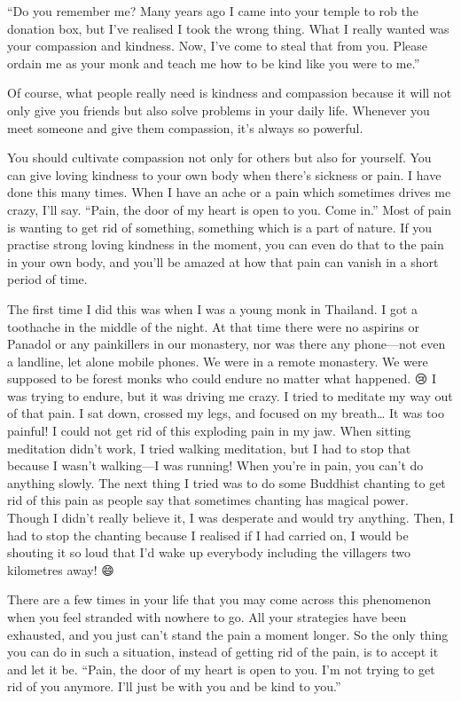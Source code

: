 \documentclass[12pt, openany]{book}
\begin{document}
“Do you remember me? Many years ago I came into your temple to rob the donation box, but I’ve realised I took the wrong thing. What I really wanted was your compassion and kindness. Now, I’ve come to steal that from you. Please ordain me as your monk and teach me how to be kind like you were to me.” 

Of course, what people really need is kindness and compassion because it will not only give you friends but also solve problems in your daily life. Whenever you meet someone and give them compassion, it’s always so powerful. 

You should cultivate compassion not only for others but also for yourself. You can give loving kindness to your own body when there’s sickness or pain. I have done this many times. When I have an ache or a pain which sometimes drives me crazy, I’ll say. “Pain, the door of my heart is open to you. Come in.” Most of pain is wanting to get rid of something, something which is a part of nature. If you practise strong loving kindness in the moment, you can even do that to the pain in your own body, and you’ll be amazed at how that pain can vanish in a short period of time. 

The first time I did this was when I was a young monk in Thailand. I got a toothache in the middle of the night. At that time there were no aspirins or Panadol or any painkillers in our monastery, nor was there any phone—not even a landline, let alone mobile phones. We were in a remote monastery. We were supposed to be forest monks who could endure no matter what happened. 😢 I was trying to endure, but it was driving me crazy. I tried to meditate my way out of that pain. I sat down, crossed my legs, and focused on my breath… It was too painful! I could not get rid of this exploding pain in my jaw. When sitting meditation didn’t work, I tried walking meditation, but I had to stop that because I wasn’t walking—I was running! When you’re in pain, you can’t do anything slowly. The next thing I tried was to do some Buddhist chanting to get rid of this pain as people say that sometimes chanting has magical power. Though I didn’t really believe it, I was desperate and would try anything. Then, I had to stop the chanting because I realised if I had carried on, I would be shouting it so loud that I’d wake up everybody including the villagers two kilometres away! 😄

There are a few times in your life that you may come across this phenomenon when you feel stranded with nowhere to go. All your strategies have been exhausted, and you just can’t stand the pain a moment longer. So the only thing you can do in such a situation, instead of getting rid of the pain, is to accept it and let it be. “Pain, the door of my heart is open to you. I’m not trying to get rid of you anymore. I’ll just be with you and be kind to you.” 
\end{document}
